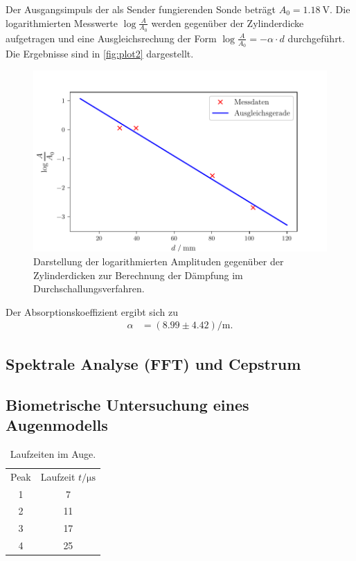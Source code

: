 Der Ausgangsimpuls der als Sender fungierenden Sonde beträgt $A_0= \qty{1.18}{\volt}$.
Die logarithmierten Messwerte $\log{\frac{A}{A_0}}$ werden gegenüber der Zylinderdicke aufgetragen und eine 
Ausgleichsrechung der Form $\log{\frac{A}{A_0}}= -\alpha \cdot d$ durchgeführt. Die Ergebnisse sind in \autoref{fig:plot2} dargestellt.
\begin{figure}[H]
  \centering
  \includegraphics{build/plot2.pdf}
  \caption {Darstellung der logarithmierten Amplituden gegenüber der Zylinderdicken zur Berechnung der Dämpfung im Durchschallungsverfahren.}
  \label{fig:plot2}
\end{figure}

Der Absorptionskoeffizient ergibt sich zu
\begin{align*}
  \alpha &=( 8.99\pm 4.42) \si{\per\meter}.
\end{align*}

\subsection{Spektrale Analyse (FFT) und Cepstrum}
\label{subsec:FFT}


\subsection{Biometrische Untersuchung eines Augenmodells}
\label{subsec:Augew}

\begin{table}[H]
  \centering
  \caption{Laufzeiten im Auge.}
  \label{tab:Auge}
  \begin{tabular}{S[table-format=1.0] S[table-format=2.0] }
  \toprule
  {Peak} & {Laufzeit $t / \si{\micro\second}$} \\
  1 &  7 \\
  2 &  11 \\
  3 &  17 \\
  4 &  25 \\
  \bottomrule
  \end{tabular}
\end{table}
